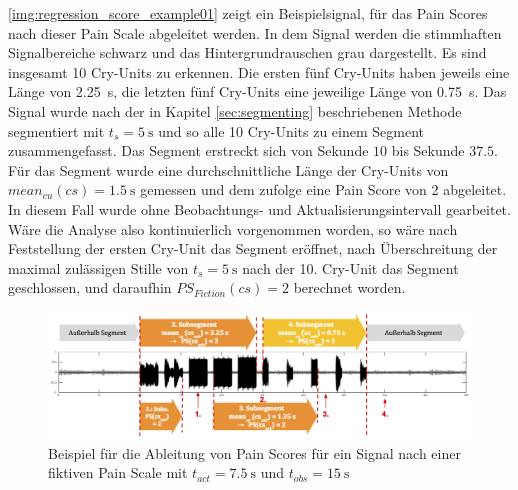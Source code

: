 \autoref{img:regression_score_example01} zeigt ein Beispielsignal, für das Pain Scores nach dieser Pain Scale abgeleitet werden. In dem Signal werden die stimmhaften Signalbereiche schwarz und das Hintergrundrauschen grau dargestellt. Es sind insgesamt 10 Cry-Units zu erkennen. Die ersten fünf Cry-Units haben jeweils eine Länge von \SI{2.25}{\second}, die letzten fünf Cry-Units eine jeweilige Länge von \SI{0.75}{\second}. Das Signal wurde nach der in Kapitel \ref{sec:segmenting} beschriebenen Methode segmentiert mit $t_s = \SI{5}{\second}$ und so alle 10 Cry-Units zu einem Segment zusammengefasst. Das Segment erstreckt sich von Sekunde $10$ bis Sekunde $37.5$. Für das Segment wurde eine durchschnittliche Länge der Cry-Units von $mean_{cu}(cs) = \SI{1.5}{\second}$ gemessen und dem zufolge eine Pain Score von 2 abgeleitet. In diesem Fall wurde ohne Beobachtungs- und Aktualisierungsintervall gearbeitet. Wäre die Analyse also kontinuierlich vorgenommen worden, so wäre nach Feststellung der ersten Cry-Unit das Segment eröffnet, nach Überschreitung der maximal zulässigen Stille von $t_s = \SI{5}{\second}$ nach der 10. Cry-Unit das Segment geschlossen, und daraufhin $PS_{Fiction}(cs) = 2$ berechnet worden.

\begin{figure}[h]
	\centering
	\includegraphics[width=1\textwidth]{bilder/regression_score_example05.png}
	\caption{Beispiel für die Ableitung von Pain Scores für ein Signal nach einer fiktiven Pain Scale mit $t_{act} = \SI{7.5}{\second}$ und $t_{obs} = \SI{15}{\second}$}
	\label{img:regression_score_example02}
\end{figure}

